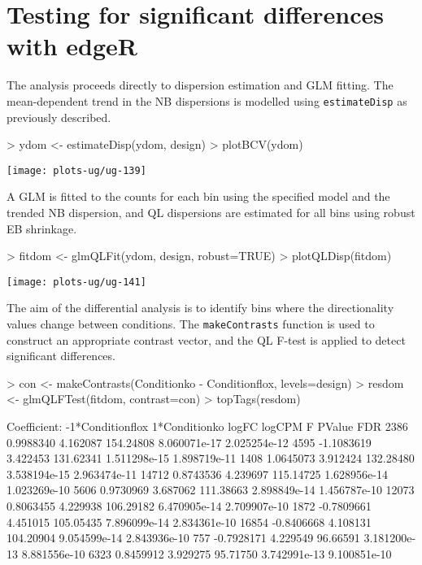 \documentclass[12pt]{report}
\renewenvironment{Schunk}{\vspace{0pt}}{\vspace{0pt}}
\newcommand{\edgeR}{edgeR}
\newcommand{\code}[1]{{\small\texttt{#1}}}
\begin{document}
\section{Testing for significant differences with \edgeR{}}
The analysis proceeds directly to dispersion estimation and GLM fitting.
The mean-dependent trend in the NB dispersions is modelled using \code{estimateDisp} as previously described.

\begin{Schunk}
\begin{Sinput}
> ydom <- estimateDisp(ydom, design)
> plotBCV(ydom)
\end{Sinput}
\end{Schunk}

\begin{center}
\texttt{[image: plots-ug/ug-139]}
\end{center}

A GLM is fitted to the counts for each bin using the specified model and the trended NB dispersion, and QL dispersions are estimated for all bins using robust EB shrinkage.

\begin{Schunk}
\begin{Sinput}
> fitdom <- glmQLFit(ydom, design, robust=TRUE)
> plotQLDisp(fitdom)
\end{Sinput}
\end{Schunk}

\begin{center}
\texttt{[image: plots-ug/ug-141]}
\end{center}


The aim of the differential analysis is to identify bins where the directionality values change between conditions.
The \code{makeContrasts} function is used to construct an appropriate contrast vector, and the QL F-test is applied to detect significant differences.

\begin{Schunk}
\begin{Sinput}
> con <- makeContrasts(Conditionko - Conditionflox, levels=design)
> resdom <- glmQLFTest(fitdom, contrast=con)
> topTags(resdom)
\end{Sinput}
\begin{Soutput}
Coefficient:  -1*Conditionflox 1*Conditionko 
           logFC   logCPM         F       PValue          FDR
2386   0.9988340 4.162087 154.24808 8.060071e-17 2.025254e-12
4595  -1.1083619 3.422453 131.62341 1.511298e-15 1.898719e-11
1408   1.0645073 3.912424 132.28480 3.538194e-15 2.963474e-11
14712  0.8743536 4.239697 115.14725 1.628956e-14 1.023269e-10
5606   0.9730969 3.687062 111.38663 2.898849e-14 1.456787e-10
12073  0.8063455 4.229938 106.29182 6.470905e-14 2.709907e-10
1872  -0.7809661 4.451015 105.05435 7.896099e-14 2.834361e-10
16854 -0.8406668 4.108131 104.20904 9.054599e-14 2.843936e-10
757   -0.7928171 4.229549  96.66591 3.181200e-13 8.881556e-10
6323   0.8459912 3.929275  95.71750 3.742991e-13 9.100851e-10
\end{Soutput}
\end{Schunk}
\end{document}
